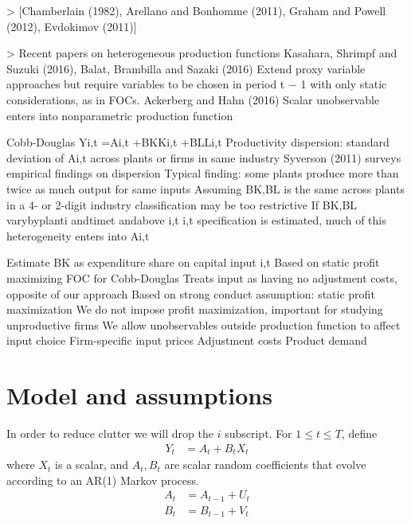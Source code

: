 > [Chamberlain (1982), Arellano and Bonhomme (2011), Graham
and Powell (2012), Evdokimov (2011)]

> Recent papers on heterogeneous production functions Kasahara, Shrimpf and Suzuki (2016), Balat, Brambilla and Sazaki (2016)
  Extend proxy variable approaches but require variables to be chosen in period t − 1 with only static considerations, as in FOCs. Ackerberg and Hahn (2016)
  Scalar unobservable enters into nonparametric production function
  
  
  
  Cobb-Douglas
  Yi,t =Ai,t +BKKi,t +BLLi,t
    Productivity dispersion: standard deviation of Ai,t across plants or firms in same industry
    Syverson (2011) surveys empirical findings on dispersion
    Typical finding: some plants produce more than twice as much
  output for same inputs
    Assuming  BK,BL  is the same across plants in a 4- or 2-digit industry classification may be too restrictive
    If BK,BL  varybyplanti andtimet andabove i,t i,t
  specification is estimated, much of this heterogeneity enters into Ai,t
  
  
  Estimate BK as expenditure share on capital input i,t
  Based on static profit maximizing FOC for Cobb-Douglas
  Treats input as having no adjustment costs, opposite of our
approach
  Based on strong conduct assumption: static profit maximization
  We do not impose profit maximization, important for studying unproductive firms
  We allow unobservables outside production function to affect input choice
  Firm-specific input prices
  Adjustment costs
  Product demand


\section{Model and assumptions}

In order to reduce clutter we will drop the $i$ subscript. For $1 \leq t \leq T$, define
\begin{align*}
Y_{t} &= A_{t} + B_{t}X_{t}
\end{align*}
where $X_{t}$ is a scalar, and $A_{t}, B_{t}$ are scalar random coefficients that evolve according to an AR(1) Markov process.
\begin{align}
  A_{t} &= A_{t-1} + U_{t} \\
  B_{t} &= B_{t-1} + V_{t}  
\end{align}
% 

